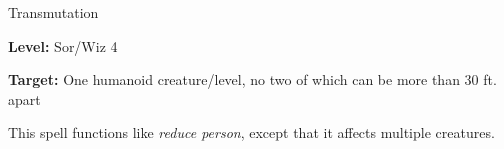 \label{spell:Mass Reduce Person}

Transmutation

\textbf{Level:} Sor/Wiz 4

\textbf{Target:} One humanoid creature/level, no two of which can be more than 
30 ft. apart

This spell functions like \textit{reduce person}, except that it affects multiple 
creatures.

